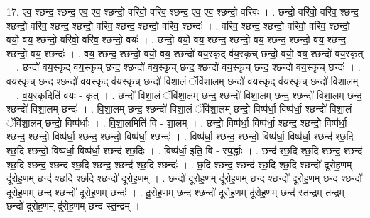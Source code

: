 \documentclass[17pt]{extarticle}
\begin{document}
17. एव॒ श्छन्द॒ श्छन्द॒ एव॒ एव॒ श्छन्दो॒ वरि॑वो॒ वरि॑व॒ श्छन्द॒ एव॒ एव॒ श्छन्दो॒ वरि॑वः । . छन्दो॒ वरि॑वो॒ वरि॑व॒ श्छन्द॒ श्छन्दो॒ वरि॑व॒ श्छन्द॒ श्छन्दो॒ वरि॑व॒ श्छन्द॒ श्छन्दो॒ वरि॑व॒ श्छन्दः॑ । . वरि॑व॒ श्छन्द॒ श्छन्दो॒ वरि॑वो॒ वरि॑व॒ श्छन्दो॒ वयो॒ वय॒ श्छन्दो॒ वरि॑वो॒ वरि॑व॒ श्छन्दो॒ वयः॑ । . छन्दो॒ वयो॒ वय॒ श्छन्द॒ श्छन्दो॒ वय॒ श्छन्द॒ श्छन्दो॒ वय॒ श्छन्द॒ श्छन्दो॒ वय॒ श्छन्दः॑ । . वय॒ श्छन्द॒ श्छन्दो॒ वयो॒ वय॒ श्छन्दो॑ वय॒स्कृद् व॑य॒स्कृच् छन्दो॒ वयो॒ वय॒ श्छन्दो॑ वय॒स्कृत् । . छन्दो॑ वय॒स्कृद् व॑य॒स्कृच् छन्द॒ श्छन्दो॑ वय॒स्कृच् छन्द॒ श्छन्दो॑ वय॒स्कृच् छन्द॒ श्छन्दो॑ वय॒स्कृच् छन्दः॑ । . व॒य॒स्कृच् छन्द॒ श्छन्दो॑ वय॒स्कृद् व॑य॒स्कृच् छन्दो॑ विशा॒लं ॅवि॑शा॒लम् छन्दो॑ वय॒स्कृद् व॑य॒स्कृच् छन्दो॑ विशा॒लम् । . व॒य॒स्कृदिति॑ वयः - कृत् । . छन्दो॑ विशा॒लं ॅवि॑शा॒लम् छन्द॒ श्छन्दो॑ विशा॒लम् छन्द॒ श्छन्दो॑ विशा॒लम् छन्द॒ श्छन्दो॑ विशा॒लम् छन्दः॑ । . वि॒शा॒लम् छन्द॒ श्छन्दो॑ विशा॒लं ॅवि॑शा॒लम् छन्दो॒ विष्प॑र्धा॒ विष्प॑र्धा॒ श्छन्दो॑ विशा॒लं ॅवि॑शा॒लम् छन्दो॒ विष्प॑र्धाः । . वि॒शा॒लमिति॑ वि - शा॒लम् । . छन्दो॒ विष्प॑र्धा॒ विष्प॑र्धा॒ श्छन्द॒ श्छन्दो॒ विष्प॑र्धा॒ श्छन्द॒ श्छन्दो॒ विष्प॑र्धा॒ श्छन्द॒ श्छन्दो॒ विष्प॑र्धा॒ श्छन्दः॑ । . विष्प॑र्धा॒ श्छन्द॒ श्छन्दो॒ विष्प॑र्धा॒ विष्प॑र्धा॒ श्छन्द॑ श्छ॒दि श्छ॒दि श्छन्दो॒ विष्प॑र्धा॒ विष्प॑र्धा॒ श्छन्द॑ श्छ॒दिः । . विष्प॑र्धा॒ इति॒ वि - स्प॒र्द्धाः॒ । . छन्द॑ श्छ॒दि श्छ॒दि श्छन्द॒ श्छन्द॑ श्छ॒दि श्छन्द॒ श्छन्द॑ श्छ॒दि श्छन्द॒ श्छन्द॑ श्छ॒दि श्छन्दः॑ । . छ॒दि श्छन्द॒ श्छन्द॑ श्छ॒दि श्छ॒दि श्छन्दो॑ दूरोह॒णम् दू॑रोह॒णम् छन्द॑ श्छ॒दि श्छ॒दि श्छन्दो॑ दूरोह॒णम् । . छन्दो॑ दूरोह॒णम् दू॑रोह॒णम् छन्द॒ श्छन्दो॑ दूरोह॒णम् छन्द॒ श्छन्दो॑ दूरोह॒णम् छन्द॒ श्छन्दो॑ दूरोह॒णम् छन्दः॑ । . दू॒रो॒ह॒णम् छन्द॒ श्छन्दो॑ दूरोह॒णम् दू॑रोह॒णम् छन्द॑ स्त॒न्द्रम् त॒न्द्रम् छन्दो॑ दूरोह॒णम् दू॑रोह॒णम् छन्द॑ स्त॒न्द्रम् । \newline
\end{document}
